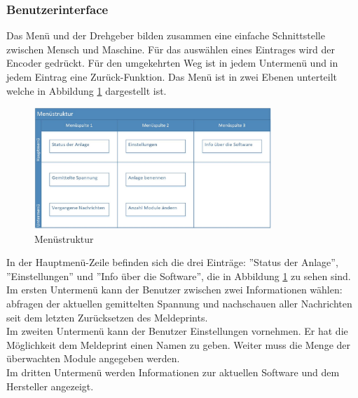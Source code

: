 \subsubsection{Benutzerinterface}
Das Menü und der Drehgeber bilden zusammen eine einfache Schnittstelle zwischen Mensch und Maschine. Für das auswählen eines Eintrages wird der Encoder gedrückt. Für den umgekehrten Weg ist in jedem Untermenü und in jedem Eintrag eine Zurück-Funktion. Das Menü ist in zwei Ebenen unterteilt welche in Abbildung \ref{fig:structure-menu} dargestellt ist.

\begin{figure}[htbp] 
  \centering
     \includegraphics[width=0.8\textwidth]{graphics/structure-menu}
  \caption{Menüstruktur}
  \label{fig:structure-menu}
\end{figure}
In der Hauptmenü-Zeile befinden sich die drei Einträge: ''Status der Anlage'', ''Einstellungen'' und ''Info über die Software'', die in Abbildung \ref{fig:structure-menu} zu sehen sind.\\
Im ersten Untermenü kann der Benutzer zwischen zwei Informationen wählen: abfragen der aktuellen gemittelten Spannung und nachschauen aller Nachrichten seit dem letzten Zurücksetzen des Meldeprints.\\
Im zweiten Untermenü kann der Benutzer Einstellungen vornehmen. Er hat die Möglichkeit dem Meldeprint einen Namen zu geben. Weiter muss die Menge der überwachten Module angegeben werden.\\
Im dritten Untermenü werden Informationen zur aktuellen Software und dem Hersteller angezeigt.\\